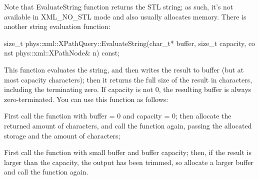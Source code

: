 Note that EvaluateString function returns the STL string; as such, it's not available in XML\_\-NO\_\-STL mode and also usually allocates memory. There is another string evaluation function: 
\begin{DoxyCode}
 size_t phys::xml::XPathQuery::EvaluateString(char_t* buffer, size_t capacity, co
      nst phys::xml::XPathNode& n) const;
\end{DoxyCode}
 This function evaluates the string, and then writes the result to buffer (but at most capacity characters); then it returns the full size of the result in characters, including the terminating zero. If capacity is not 0, the resulting buffer is always zero-\/terminated. You can use this function as follows:
\begin{DoxyItemize}
\item First call the function with buffer = 0 and capacity = 0; then allocate the returned amount of characters, and call the function again, passing the allocated storage and the amount of characters;
\item First call the function with small buffer and buffer capacity; then, if the result is larger than the capacity, the output has been trimmed, so allocate a larger buffer and call the function again.
\end{DoxyItemize}

